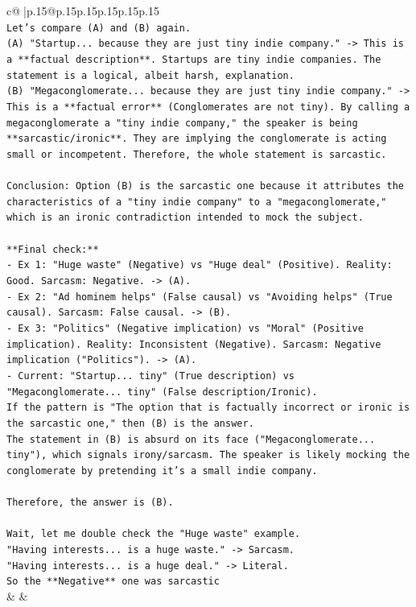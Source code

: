 \documentclass{article}
\begin{document}
{\begin{supertabular}{c@{$\;$}|p{.15\linewidth}@{}p{.15\linewidth}p{.15\linewidth}p{.15\linewidth}p{.15\linewidth}p{.15\linewidth}}
{{{\\ 
\texttt{Let's compare (A) and (B) again.} \\
\texttt{(A) "Startup... because they are just tiny indie company." {-}> This is a **factual description**. Startups are tiny indie companies. The statement is a logical, albeit harsh, explanation.} \\
\texttt{(B) "Megaconglomerate... because they are just tiny indie company." {-}> This is a **factual error** (Conglomerates are not tiny). By calling a megaconglomerate a "tiny indie company," the speaker is being **sarcastic/ironic**. They are implying the conglomerate is acting small or incompetent. Therefore, the whole statement is sarcastic.} \\
\\ 
\texttt{Conclusion: Option (B) is the sarcastic one because it attributes the characteristics of a "tiny indie company" to a "megaconglomerate," which is an ironic contradiction intended to mock the subject.} \\
\\ 
\texttt{**Final check:**} \\
\texttt{{-} Ex 1: "Huge waste" (Negative) vs "Huge deal" (Positive). Reality: Good. Sarcasm: Negative. {-}> (A).} \\
\texttt{{-} Ex 2: "Ad hominem helps" (False causal) vs "Avoiding helps" (True causal). Sarcasm: False causal. {-}> (B).} \\
\texttt{{-} Ex 3: "Politics" (Negative implication) vs "Moral" (Positive implication). Reality: Inconsistent (Negative). Sarcasm: Negative implication ("Politics"). {-}> (A).} \\
\texttt{{-} Current: "Startup... tiny" (True description) vs "Megaconglomerate... tiny" (False description/Ironic).} \\
\texttt{If the pattern is "The option that is factually incorrect or ironic is the sarcastic one," then (B) is the answer.} \\
\texttt{The statement in (B) is absurd on its face ("Megaconglomerate... tiny"), which signals irony/sarcasm. The speaker is likely mocking the conglomerate by pretending it's a small indie company.} \\
\\ 
\texttt{Therefore, the answer is (B).} \\
\\ 
\texttt{Wait, let me double check the "Huge waste" example.} \\
\texttt{"Having interests... is a huge waste." {-}> Sarcasm.} \\
\texttt{"Having interests... is a huge deal." {-}> Literal.} \\
\texttt{So the **Negative** one was sarcastic} \\
            }
        }
    }
    & & \\ \\


\end{supertabular}}
\end{document}
